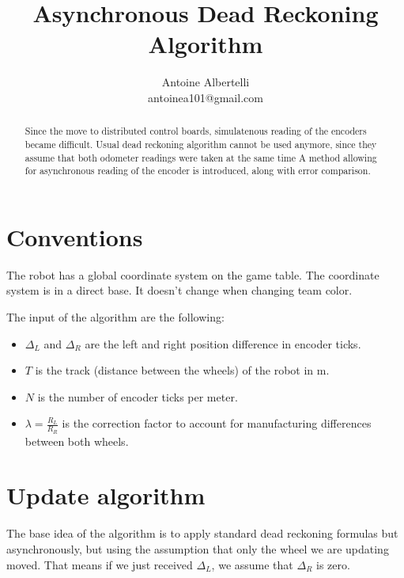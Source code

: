 \documentclass[a4paper]{IEEEtran}
\author{Antoine Albertelli\\{antoinea101@gmail.com}}
\title{Asynchronous Dead Reckoning Algorithm}
\begin{document}
\maketitle

\begin{abstract}
    Since the move to distributed control boards, simulatenous reading of the encoders became difficult.
    Usual dead reckoning algorithm cannot be used anymore, since they assume that both odometer readings were taken at the same time
    A method allowing for asynchronous reading of the encoder is introduced, along with error comparison. 
\end{abstract}

\section{Conventions}

The robot has a global coordinate system on the game table.
The coordinate system is in a direct base.
It doesn't change when changing team color.

The input of the algorithm are the following:
\begin{itemize}
    \item $\Delta_L$ and $\Delta_R$ are the left and right position difference in encoder ticks.
    \item $T$ is the track (distance between the wheels) of the robot in \si{\meter}.
    \item $N$ is the number of encoder ticks per meter.
    \item $\lambda = \frac{R_L}{R_R}$ is the correction factor to account for manufacturing differences between both wheels.
\end{itemize}

\section{Update algorithm}
The base idea of the algorithm is to apply standard dead reckoning formulas but asynchronously, but using the assumption that only the wheel we are updating moved.
That means if we just received $\Delta_L$, we assume that $\Delta_R$ is zero.
\end{document}
